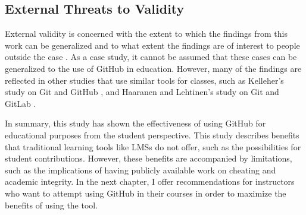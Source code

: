 \subsection{External Threats to Validity}
External validity is concerned with the extent to which the findings from this work can be generalized and to what extent the findings are of interest to people outside the case \cite{runeson2012case}. As a case study, it cannot be assumed that these cases can be generalized to the use of GitHub in education. However, many of the findings are reflected in other studies that use similar tools for classes, such as Kelleher's study on Git and GitHub \cite{kelleher2014employing}, and Haaranen and Lehtinen's study on Git and GitLab \cite{haaranen2015teaching}. %

In summary, this study has shown the effectiveness of using GitHub for educational purposes from the student perspective. This study describes benefits that traditional learning tools like LMSs do not offer, such as the possibilities for student contributions. However, these benefits are accompanied by limitations, such as the implications of having publicly available work on cheating and academic integrity. In the next chapter, I offer recommendations for instructors who want to attempt using GitHub in their courses in order to maximize the benefits of using the tool.
